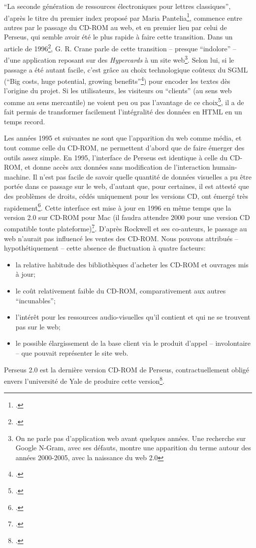 \enquote{La seconde génération de ressources électroniques pour lettres classiques}, d'après le titre du premier index proposé par Maria Pantelia\footcite{pantelia_electronic_1994}, commence entre autres par le passage du CD-ROM au web, et en premier lieu par celui de Perseus, qui semble avoir été le plus rapide à faire cette transition. Dans un article de 1996\footcite{crane_building_1996}, G. R. Crane parle de cette transition -- presque \enquote{indolore} -- d'une application reposant sur des \textit{Hypercards} à un site web\footnote{On ne parle pas d'application web avant quelques années. Une recherche sur Google N-Gram, avec ses défauts, montre une apparition du terme autour des années 2000-2005, avec la naissance du web 2.0}. Selon lui, si le passage a été autant facile, c'est grâce au choix technologique coûteux du SGML (\enquote{Big costs, huge potential, growing benefits}\footcite[p. 7]{crane_building_1996}) pour encoder les textes dès l'origine du projet. Si les utilisateurs, les visiteurs ou \enquote{clients} (au sens web comme au sens mercantile) ne voient peu ou pas l'avantage de ce choix\footcite[p. 8]{crane_building_1996}, il a de fait permis de transformer facilement l'intégralité des données en HTML en un temps record.

Les années 1995 et suivantes ne sont que l'apparition du web comme média, et tout comme celle du CD-ROM, ne permettent d'abord que de faire émerger des outils assez simple. En 1995, l'interface de Perseus est identique à celle du CD-ROM, et donne accès aux données sans modification de l'interaction humain-machine. Il n'est pas facile de savoir quelle quantité de données visuelles a pu être portée dans ce passage sur le web, d'autant que, pour certaines, il est attesté que des problèmes de droits, cédés uniquement pour les versions CD, ont émergé très rapidement\footcite[p.~3]{crane_building_1996}. Cette interface est mise à jour en 1996 en même temps que la version 2.0 sur CD-ROM pour Mac (il faudra attendre 2000 pour une version CD compatible toute plateforme)\footcite[p.~109]{rockwell_interface_2020}. D'après Rockwell et ses co-auteurs, le passage au web n'aurait pas influencé les ventes des CD-ROM. Nous pouvons attribués -- hypothétiquement -- cette absence de fluctuation à quatre facteurs:
\begin{itemize}
    \item la relative habitude des bibliothèques d'acheter les CD-ROM et ouvrages mis à jour;
    \item le coût relativement faible du CD-ROM, comparativement aux autres \enquote{incunables};
    \item l'intérêt pour les ressources audio-visuelles qu'il contient et qui ne se trouvent pas sur le web;
    \item le possible élargissement de la base client via le produit d'appel -- involontaire -- que pouvait représenter le site web.
\end{itemize}
Perseus 2.0 est la dernière version CD-ROM de Perseus, contractuellement obligé envers l'université de Yale de produire cette version\footcite[p.~3]{crane_building_1996}. 

